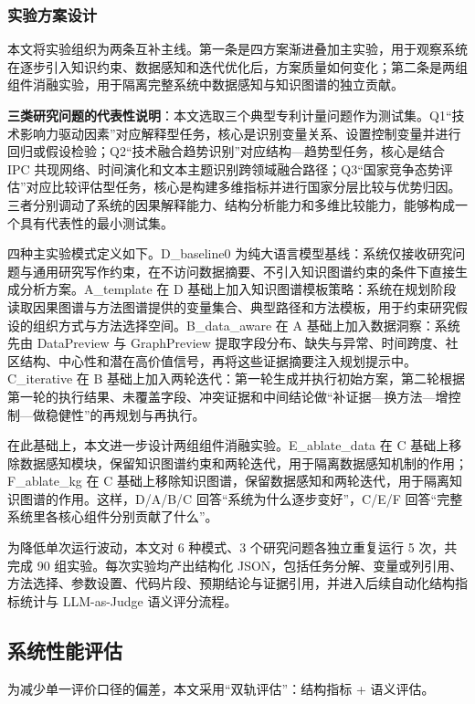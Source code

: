 \subsubsection{实验方案设计}

本文将实验组织为两条互补主线。第一条是四方案渐进叠加主实验，用于观察系统在逐步引入知识约束、数据感知和迭代优化后，方案质量如何变化；第二条是两组组件消融实验，用于隔离完整系统中数据感知与知识图谱的独立贡献。

\textbf{三类研究问题的代表性说明}：本文选取三个典型专利计量问题作为测试集。Q1“技术影响力驱动因素”对应解释型任务，核心是识别变量关系、设置控制变量并进行回归或假设检验；Q2“技术融合趋势识别”对应结构—趋势型任务，核心是结合 IPC 共现网络、时间演化和文本主题识别跨领域融合路径；Q3“国家竞争态势评估”对应比较评估型任务，核心是构建多维指标并进行国家分层比较与优势归因。三者分别调动了系统的因果解释能力、结构分析能力和多维比较能力，能够构成一个具有代表性的最小测试集。

四种主实验模式定义如下。D\_baseline0 为纯大语言模型基线：系统仅接收研究问题与通用研究写作约束，在不访问数据摘要、不引入知识图谱约束的条件下直接生成分析方案。A\_template 在 D 基础上加入知识图谱模板策略：系统在规划阶段读取因果图谱与方法图谱提供的变量集合、典型路径和方法模板，用于约束研究假设的组织方式与方法选择空间。B\_data\_aware 在 A 基础上加入数据洞察：系统先由 DataPreview 与 GraphPreview 提取字段分布、缺失与异常、时间跨度、社区结构、中心性和潜在高价值信号，再将这些证据摘要注入规划提示中。C\_iterative 在 B 基础上加入两轮迭代：第一轮生成并执行初始方案，第二轮根据第一轮的执行结果、未覆盖字段、冲突证据和中间结论做“补证据—换方法—增控制—做稳健性”的再规划与再执行。

在此基础上，本文进一步设计两组组件消融实验。E\_ablate\_data 在 C 基础上移除数据感知模块，保留知识图谱约束和两轮迭代，用于隔离数据感知机制的作用；F\_ablate\_kg 在 C 基础上移除知识图谱，保留数据感知和两轮迭代，用于隔离知识图谱的作用。这样，D/A/B/C 回答“系统为什么逐步变好”，C/E/F 回答“完整系统里各核心组件分别贡献了什么”。

为降低单次运行波动，本文对 6 种模式、3 个研究问题各独立重复运行 5 次，共完成 90 组实验。每次实验均产出结构化 JSON，包括任务分解、变量或列引用、方法选择、参数设置、代码片段、预期结论与证据引用，并进入后续自动化结构指标统计与 LLM-as-Judge 语义评分流程。

\subsection{系统性能评估}

为减少单一评价口径的偏差，本文采用“双轨评估”：结构指标 + 语义评估\cite{sun2025survey,zheng2023judging}。

